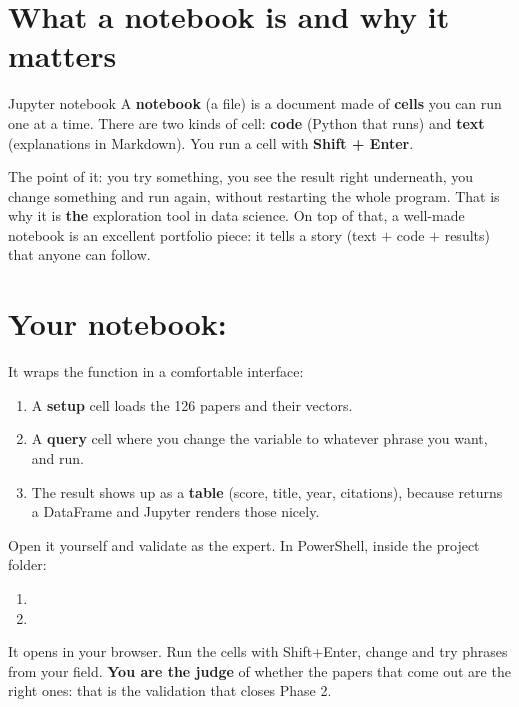 \documentclass[11pt,a4paper]{article}
\begin{document}

\section{What a notebook is and why it matters}

\begin{concepto}{Jupyter notebook}
A \textbf{notebook} (a  file) is a document made of \textbf{cells} you can run
one at a time. There are two kinds of cell: \textbf{code} (Python that runs) and \textbf{text}
(explanations in Markdown). You run a cell with \textbf{Shift + Enter}.
\end{concepto}

The point of it: you try something, you see the result right underneath, you change something
and run again, without restarting the whole program. That is why it is \textbf{the}
exploration tool in data science. On top of that, a well-made notebook is an excellent
portfolio piece: it tells a story (text $+$ code $+$ results) that anyone can follow.

\section{Your notebook: }

It wraps the  function in a comfortable interface:
\begin{enumerate}
  \item A \textbf{setup} cell loads the 126 papers and their vectors.
  \item A \textbf{query} cell where you change the  variable to whatever
        phrase you want, and run.
  \item The result shows up as a \textbf{table} (score, title, year, citations), because
         returns a DataFrame and Jupyter renders those nicely.
\end{enumerate}

\begin{practica}
Open it yourself and validate as the expert. In PowerShell, inside the project folder:
\begin{enumerate}
  \item {}
  \item {}
\end{enumerate}
It opens in your browser. Run the cells with Shift+Enter, change  and try
phrases from your field. \textbf{You are the judge} of whether the papers that come out are
the right ones: that is the validation that closes Phase 2.
\end{practica}
\end{document}
